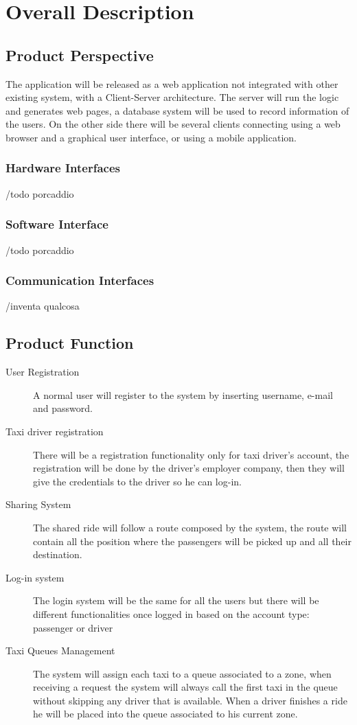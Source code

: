 \section{Overall Description}

\subsection{Product Perspective}
	The application will be released as a web application not integrated with other existing system, with a Client-Server architecture. The server will run the logic and generates web pages, a database system will be used to record information of the users. On the other side there will be several clients connecting using a web browser and a graphical user interface, or using a mobile application.	
	
	\subsubsection{Hardware Interfaces}
	/todo porcaddio
	\subsubsection{Software Interface}
	/todo porcaddio
	\subsubsection{Communication Interfaces}
	/inventa qualcosa
		
\subsection{Product Function}
	\begin{description}
		\item [User Registration] A normal user will register to the system by inserting username, e-mail and password.
		\item [Taxi driver registration] There will be a registration functionality only for taxi driver's account, the registration will be done by the driver's employer company, then they will give the credentials to the driver so he can log-in.
		\item [Sharing System] The shared ride will follow a route composed by the system, the route will contain all the position where the passengers will be picked up and all their destination.
		\item [Log-in system] The login system will be the same for all the users but there will be different functionalities once logged in based on the account type: passenger or driver
		\item [Taxi Queues Management] The system will assign each taxi to a queue associated to a zone, when receiving a request the system will always call the first taxi in the queue without skipping any driver that is available. When a driver finishes a ride he will be placed into the queue associated to his current zone.
	\end{description}
	
